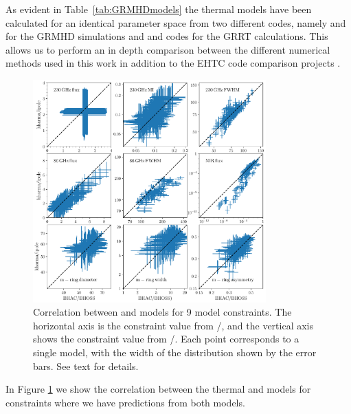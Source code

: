 

As evident in Table~\ref{tab:GRMHDmodels} the thermal models have been calculated for an identical parameter space from two different codes, namely \kharma and \bhac for the GRMHD simulations and \ipole and \bhoss codes for the GRRT calculations. This allows us to perform an in depth comparison between the different numerical methods used in this work in addition to the EHTC code comparison projects \citep{2019ApJS..243...26P,2020ApJ...897..148G}.

\begin{figure}
  \centering
  \includegraphics[width=0.8\textwidth]{./figures/BHAC_iharm_correlation2}
  \caption{Correlation between \bhac and \kharma models for 9 model constraints.  The horizontal axis is the constraint value from \bhac/\bhoss, and the vertical axis shows the constraint value from \kharma/\ipole.  Each point corresponds to a single model, with the width of the distribution shown by the error bars.  See text for details.}
  \label{fig:modelcorrelation}
\end{figure}

In Figure \ref{fig:modelcorrelation} we show the correlation between the thermal \kharma and \bhac models for constraints where we have predictions from both models.

